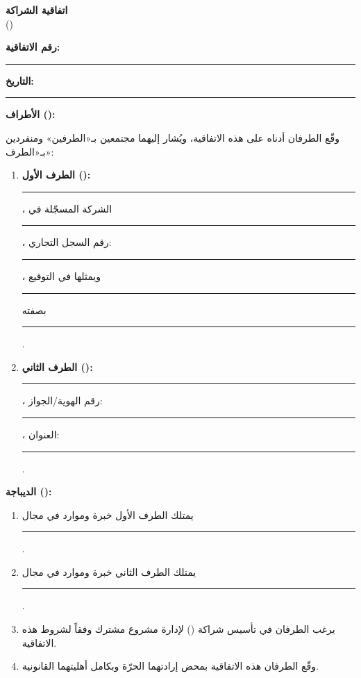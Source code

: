 \documentclass[12pt,a4paper]{article}
\begin{document}
\begin{center}
{\LARGE\bfseries اتفاقية الشراكة}\\[0.5em]
{\large ()}\\[1em]
\end{center}

\vspace{0.5em}

\noindent\textbf{رقم الاتفاقية:} \rule{4cm}{0.4pt} \hfill \textbf{التاريخ:} \rule{4cm}{0.4pt}

\vspace{1em}

\noindent\textbf{الأطراف ():}

\noindent وقّع الطرفان أدناه على هذه الاتفاقية، ويُشار إليهما مجتمعين بـ«الطرفين» ومنفردين بـ«الطرف»:

\begin{enumerate}
    \item \textbf{الطرف الأول ():} \rule{6cm}{0.4pt}، الشركة المسجّلة في \rule{4cm}{0.4pt}، رقم السجل التجاري: \rule{3cm}{0.4pt}، ويمثلها في التوقيع \rule{5cm}{0.4pt} بصفته \rule{3cm}{0.4pt}.

    \item \textbf{الطرف الثاني ():} \rule{6cm}{0.4pt}، رقم الهوية/الجواز: \rule{3cm}{0.4pt}، العنوان: \rule{5cm}{0.4pt}.
\end{enumerate}

\vspace{1em}

\noindent\textbf{الديباجة ():}

\begin{enumerate}
    \item يمتلك الطرف الأول خبرة وموارد في مجال \rule{5cm}{0.4pt}.
    \item يمتلك الطرف الثاني خبرة وموارد في مجال \rule{5cm}{0.4pt}.
    \item يرغب الطرفان في تأسيس شراكة () لإدارة مشروع مشترك وفقاً لشروط هذه الاتفاقية.
    \item وقّع الطرفان هذه الاتفاقية بمحض إرادتهما الحرّة وبكامل أهليتهما القانونية.
\end{enumerate}
\end{document}
